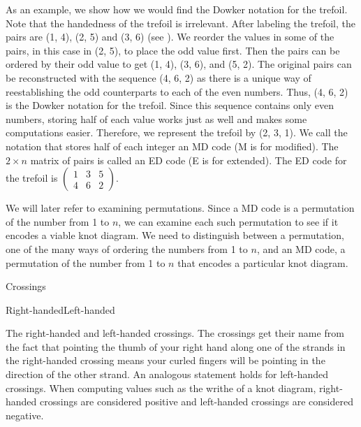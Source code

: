 \begin{paper}
As an example, we show how we would find the Dowker notation for the trefoil.
Note that the handedness of the trefoil is irrelevant.
After labeling the trefoil, the pairs are (1, 4), (2, 5) and (3, 6) (see
\figLabeled).
We reorder the values in some of the pairs, in this case in (2, 5), to place the
odd value first.
Then the pairs can be ordered by their odd value to get (1, 4), (3, 6), and
(5, 2).
The original pairs can be reconstructed with the sequence (4, 6, 2) as there is
a unique way of reestablishing the odd counterparts to each of the even numbers.
Thus, (4, 6, 2) is the Dowker notation for the trefoil.
Since this sequence contains only even numbers, storing half of each value works
just as well and makes some computations easier.
Therefore, we represent the trefoil by (2, 3, 1).
We call the notation that stores half of each integer an MD code (M is for
modified).
The $2\times n$ matrix of pairs is called an ED code (E is for extended).
The ED code for the trefoil is $\begin{pmatrix}1&3&5\\4&6&2\end{pmatrix}$.

We will later refer to examining permutations.
Since a MD code is a permutation of the number from 1 to $n$, we can examine
each such permutation to see if it encodes a viable knot diagram.
We need to distinguish between a permutation, one of the many ways of ordering
the numbers from 1 to $n$, and an MD code, a permutation of the number from 1 to
$n$ that encodes a particular knot diagram.\\

{\begin{center}Crossings\end{center}\vspace{-1em}
\hfill
{}\vspace{-0.5em}
\begin{center}Right-handed\hspace{0.37\columnwidth}Left-handed\end{center}
\vspace{-1em}}
{The right-handed and left-handed crossings.
The crossings get their name from the fact that pointing the thumb of your right
hand along one of the strands in the right-handed crossing means your curled
fingers will be pointing in the direction of the other strand.
An analogous statement holds for left-handed crossings.
When computing values such as the writhe of a knot diagram, right-handed
crossings are considered positive and left-handed crossings are considered
negative.}


\end{paper}
